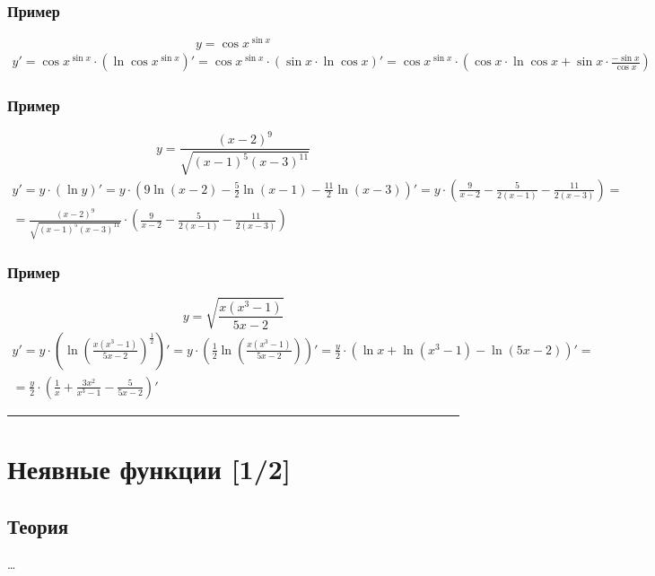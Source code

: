 \documentclass{article}
\begin{document}
\subsubsection{Пример}
\[
    y = \cos x^{\sin x}
\]
\begin{gather*}
    y' = \cos x^{\sin x} \cdot \left( \ln \cos x^{\sin x} \right)' =
    \cos x^{\sin x} \cdot \left( \sin x \cdot \ln \cos x \right)' =
    \cos x^{\sin x} \cdot \left( \cos x \cdot \ln \cos x + \sin x \cdot \frac{-\sin x}{\cos x} \right)
\end{gather*}

\subsubsection{Пример}
\[
    y = \frac{(x - 2)^9}{\sqrt{(x - 1)^5(x - 3)^{11}}}
\]
\begin{gather*}
    y' = y \cdot (\ln y)' =
    y \cdot \left( 9\ln(x - 2) - \frac{5}{2}\ln(x - 1) - \frac{11}{2}\ln(x - 3) \right)' =
    y \cdot \left( \frac{9}{x - 2} - \frac{5}{2(x - 1)} - \frac{11}{2(x - 3)} \right) = \\
    = \frac{(x - 2)^9}{\sqrt{(x - 1)^5(x - 3)^{11}}} \cdot \left( \frac{9}{x - 2} - \frac{5}{2(x - 1)} - \frac{11}{2(x - 3)} \right)
\end{gather*}

\subsubsection{Пример}
\[
    y = \sqrt{\frac{x(x^3 - 1)}{5x - 2}}
\]
\begin{gather*}
    y' = y \cdot \left( \ln \left( \frac{x(x^3 - 1)}{5x - 2} \right)^{\frac{1}{2}} \right)' =
    y \cdot \left( \frac{1}{2} \ln \left( \frac{x(x^3 - 1)}{5x - 2} \right)\right)' =
    \frac{y}{2} \cdot \left( \ln x + \ln (x^3 - 1) - \ln(5x - 2) \right)' = \\
    = \frac{y}{2} \cdot \left( \frac{1}{x} + \frac{3x^2}{x^3 - 1} - \frac{5}{5x - 2} \right)'
\end{gather*}



\par\noindent\rule{\textwidth}{1pt}
\section{Неявные функции [1/2]}

\subsection{Теория}
\dots
\end{document}

